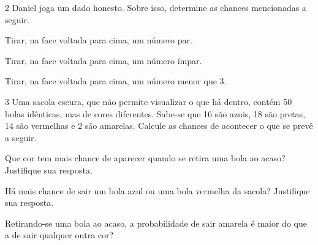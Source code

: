 \num{2} Daniel joga um dado honesto. Sobre isso, determine as chances mencionadas a seguir.

\begin{escolha}
\item
  Tirar, na face voltada para cima, um número par.


\item
  Tirar, na face voltada para cima, um número ímpar.


\item
  Tirar, na face voltada para cima, um número menor que 3.

\end{escolha}

\num{3} Uma sacola escura, que não permite visualizar o que há dentro, contém
50 bolas idênticas, mas de cores diferentes. Sabe-se que 16 são azuis,
18 são pretas, 14 são vermelhas e 2 são amarelas. Calcule as chances de
acontecer o que se prevê a seguir.

\begin{escolha}
\item
  Que cor tem mais chance de aparecer quando se retira uma bola ao acaso? Justifique sua resposta.


\item
  Há mais chance de sair um bola azul ou uma bola vermelha da sacola? Justifique sua resposta.


\item
  Retirando-se uma bola ao acaso, a probabilidade de sair amarela é maior do que a de sair qualquer
  outra cor?

\end{escolha}


